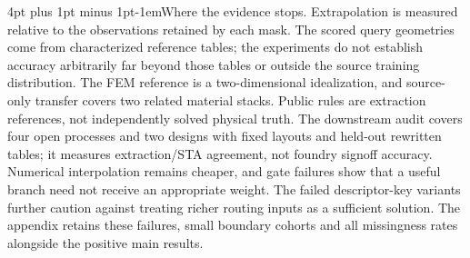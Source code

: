 \documentclass{article}
\makeatletter
\renewcommand{\paragraph}{\@startsection{paragraph}{4}{\z@}
  {4pt plus 1pt minus 1pt}{-1em}{\normalsize\bf}}
\makeatother
\begin{document}
\paragraph{Where the evidence stops.}
Extrapolation is measured relative to the observations retained by each mask.
The scored query geometries come from characterized reference tables; the
experiments do not establish accuracy arbitrarily far beyond those tables or
outside the source training distribution.
The FEM reference is a two-dimensional idealization, and source-only transfer
covers two related material stacks. Public rules are extraction references,
not independently solved physical truth. The downstream audit covers four
open processes and two designs with fixed layouts and held-out rewritten
tables; it measures extraction/STA agreement, not foundry signoff accuracy.
Numerical interpolation remains cheaper, and gate failures show that a useful
branch need not receive an appropriate weight. The failed descriptor-key
variants further caution against treating richer routing inputs as a sufficient
solution. The appendix retains these failures, small boundary cohorts and
all missingness rates alongside the positive main results.
\end{document}
